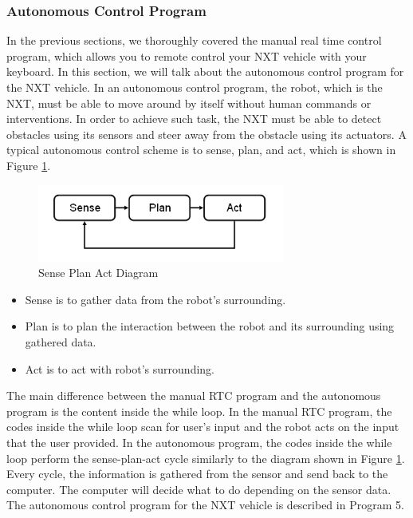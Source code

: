 \documentclass[12pt]{article}
\begin{document}
\subsubsection{Autonomous Control Program}
In the previous sections, we thoroughly covered the manual real time control program, which allows you to 
remote control your NXT vehicle with your keyboard.
In this section, we will talk about the autonomous control program for the NXT vehicle.
In an autonomous control program, the robot, which is the NXT, must be able to move around by itself without
    human commands or interventions.
In order to achieve such task, the NXT must be able to detect obstacles using its sensors and steer away from the
    obstacle using its actuators.
A typical autonomous control scheme is to sense, plan, and act, which is shown in Figure \ref{fig_NXT_SPA}.
\begin{figure}[h]
  \begin{center}
    \includegraphics[height=1in]{figure/mindstorm/Senseplanact.png}
    \caption{Sense Plan Act Diagram \label{fig_NXT_SPA}}
  \end{center}
\end{figure}
\begin{itemize}
\item Sense is to gather data from the robot's surrounding.
\item Plan is to plan the interaction between the robot and its surrounding using gathered data.
\item Act is to act with robot's surrounding.
\end{itemize}
The main difference between the manual RTC program and the autonomous program is the content inside the while loop.
In the manual RTC program, the codes inside the while loop scan for user's input and the robot acts on the input that
    the user provided.
In the autonomous program, the codes inside the while loop perform the sense-plan-act cycle similarly to the diagram
    shown in Figure \ref{fig_NXT_SPA}.
Every cycle, the information is gathered from the sensor and send back to the computer.
The computer will decide what to do depending on the sensor data.
The autonomous control program for the NXT vehicle is described in Program 5.
\end{document}
